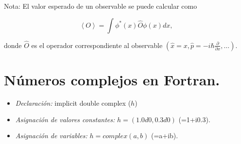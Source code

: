 \documentclass[12pt]{iopart}
\begin{document}
\begin{itemize}
\begin{itemize}
Nota: El valor esperado de un observable se puede calcular como 

$$\left< O \right >=\int  \phi^*(x) \hat{O}\phi(x) dx, $$ 

donde $\hat{O}$ es el operador correspondiente al observable $\left( \hat{x}=x, \hat{p}= -i\hbar \frac{\partial}{\partial x} , \dots  \right)$.  

\end{itemize}

\end{itemize}


\section*{N{\'u}meros complejos en Fortran.}

\begin{itemize}
\item{}{\it Declaraci{\'o}n:} implicit double complex ($h$)
\item{}{\it Asignaci{\'o}n de valores constantes:} $h=(1.0d0,0.3d0)$ (=1+i0.3).
\item{}{\it Asignaci{\'o}n de variables:} $h=complex(a,b)$ (=a+ib).
\end{itemize}




\end{document}

